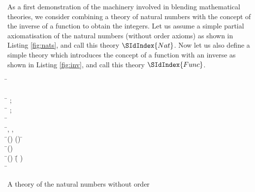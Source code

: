 As a first demonstration of the machinery involved in blending
mathematical theories, we consider combining a theory of natural
numbers with the concept of the inverse of a function to obtain the
integers. Let us assume a simple partial axiomatisation of the natural
numbers (without order axioms) as shown in Listing \ref{fig:nats}, and
call this theory $\SIdIndex{Nat}$. Now let us also define a simple theory
which introduces the concept of a function with an inverse as shown in
Listing \ref{fig:inv}, and call this theory $\SIdIndex{Func}$. 
\begin{listing}[!ht]
\begin{mdframed}
\begin{hetcasl}
\SPEC \= \Ax{=}\\
\> \SORT {}\\
\> \OPS \= \Ax{:} ;\\
\>\>  \Ax{:} \= \Ax{\rightarrow} ;\\
\>\> \Ax{\_\_}\Ax{+}\Ax{\_\_} \Ax{:} \= \Ax{\times}  \Ax{\rightarrow} \\
\> \Ax{\forall} \=, ,  \Ax{:}  \\
\> \Ax{\bullet} \=() \Ax{=} () \Ax{\Rightarrow} \= \Ax{=} \\
\> \Ax{\bullet} \Ax{\neg} \=() \Ax{=} \\
\> \Ax{\bullet} \=() \Ax{+}  \Ax{=} (\= \Ax{+} )\\
\> \Ax{\bullet} \= \Ax{+}  \Ax{=} \\
\end{hetcasl}
\end{mdframed}
\caption{A theory of the natural numbers without order}
\label{fig:nats}
\end{listing}


